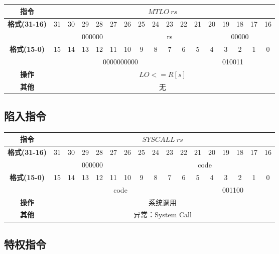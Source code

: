 \documentclass[11pt,utf8]{article}
\begin{document}
\begin{center}
\begin{tabular}{|c|c|c|c|c|c|c|c|c|c|c|c|c|c|c|c|c|}
\hline
\textbf{指令} & \multicolumn{16}{c|}{$MTLO~rs$} \\
\hline
\multirow{2}{*}{\textbf{格式(31-16)}} & 31 & 30 & 29 & 28 & 27 & 26 & 25 & 24 & 23 & 22 & 21 & 20 & 19 & 18 & 17 & 16 \\ 
\cline{2-17}
& \multicolumn{6}{c|}{000000} & \multicolumn{5}{c|}{rs}& \multicolumn{5}{c|}{00000} \\
\hline
\multirow{2}{*}{\textbf{格式(15-0)}} & 15 & 14 & 13 & 12 & 11 & 10 & 9 & 8 & 7 & 6 & 5 & 4 & 3 & 2 & 1 & 0 \\
\cline{2-17}
& \multicolumn{10}{c|}{0000000000}& \multicolumn{6}{c|}{010011}\\
\hline
\textbf{操作} & \multicolumn{16}{c|}{$LO<=R[s]$} \\
\hline
\textbf{其他} & \multicolumn{16}{c|}{无} \\
\hline
\end{tabular}
\end{center}

\subsection{陷入指令}

\begin{center}
\begin{tabular}{|c|c|c|c|c|c|c|c|c|c|c|c|c|c|c|c|c|}
\hline
\textbf{指令} & \multicolumn{16}{c|}{$SYSCALL~rs$} \\
\hline
\multirow{2}{*}{\textbf{格式(31-16)}} & 31 & 30 & 29 & 28 & 27 & 26 & 25 & 24 & 23 & 22 & 21 & 20 & 19 & 18 & 17 & 16 \\ 
\cline{2-17}
& \multicolumn{6}{c|}{000000} & \multicolumn{10}{c|}{code} \\
\hline
\multirow{2}{*}{\textbf{格式(15-0)}} & 15 & 14 & 13 & 12 & 11 & 10 & 9 & 8 & 7 & 6 & 5 & 4 & 3 & 2 & 1 & 0 \\
\cline{2-17}
& \multicolumn{10}{c|}{code}& \multicolumn{6}{c|}{001100}\\
\hline
\textbf{操作} & \multicolumn{16}{c|}{系统调用} \\
\hline
\textbf{其他} & \multicolumn{16}{c|}{异常：System Call} \\
\hline
\end{tabular}
\end{center}

\subsection{特权指令}
\end{document}
